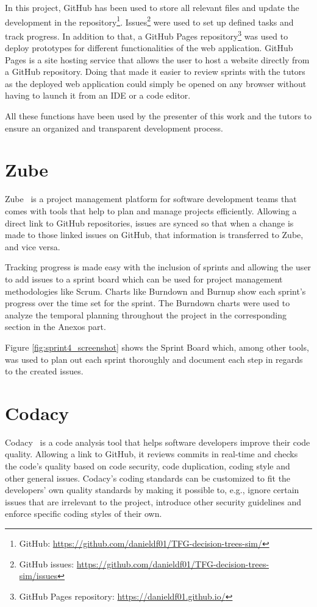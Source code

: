 In this project, GitHub has been used to store all relevant files and update the development in 
the repository\footnote{GitHub: \url{https://github.com/danieldf01/TFG-decision-trees-sim/}}. Issues\footnote{GitHub issues: \url{https://github.com/danieldf01/TFG-decision-trees-sim/issues}} were used to set up defined tasks and track progress. In addition to that, a GitHub Pages repository\footnote{GitHub Pages repository: \url{https://danieldf01.github.io/}} was used to deploy prototypes for different functionalities of the web application. GitHub Pages is a site hosting service that allows the user to host a website directly from a GitHub repository. Doing that made it easier to review sprints with the tutors as the deployed web application could simply be opened on any browser without having to launch it from an IDE or a code editor.

All these functions have been used by the presenter of this work and the tutors to ensure an organized and transparent development process.

\section{Zube}
Zube~\cite{zube} is a project management platform for software development teams that comes with tools that help to plan and manage projects efficiently. Allowing a direct link to GitHub repositories, issues are synced so that when a change is made to those linked issues on GitHub, that information is transferred to Zube, and vice versa.

Tracking progress is made easy with the inclusion of sprints and allowing the user to add issues to a sprint board which can be used for project management methodologies like Scrum. Charts like Burndown and Burnup show each sprint's progress over the time set for the sprint. The Burndown charts were used to analyze the temporal planning throughout the project in the corresponding section in the Anexos part.

Figure \ref{fig:sprint4_screenshot} shows the Sprint Board which, among other tools, was used to plan out each sprint thoroughly and document each step in regards to the created issues.

\section{Codacy} \label{codacy}
Codacy~\cite{codacy} is a code analysis tool that helps software developers improve their code quality. Allowing a link to GitHub, it reviews commits in real-time and checks the code's quality based on code security, code duplication, coding style and other general issues.
Codacy's coding standards can be customized to fit the developers' own quality standards by making it possible to, e.g., ignore certain issues that are irrelevant to the project, introduce other security guidelines and enforce specific coding styles of their own.

